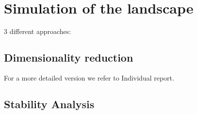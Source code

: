 \documentclass[journal, a4paper]{}
\begin{document}
\section{Simulation of the landscape}

3 different approaches:

\newline

\subsection{Dimensionality reduction}

For a more detailed version we refer to Individual report.
%

\subsection{Stability Analysis}

\end{document}
